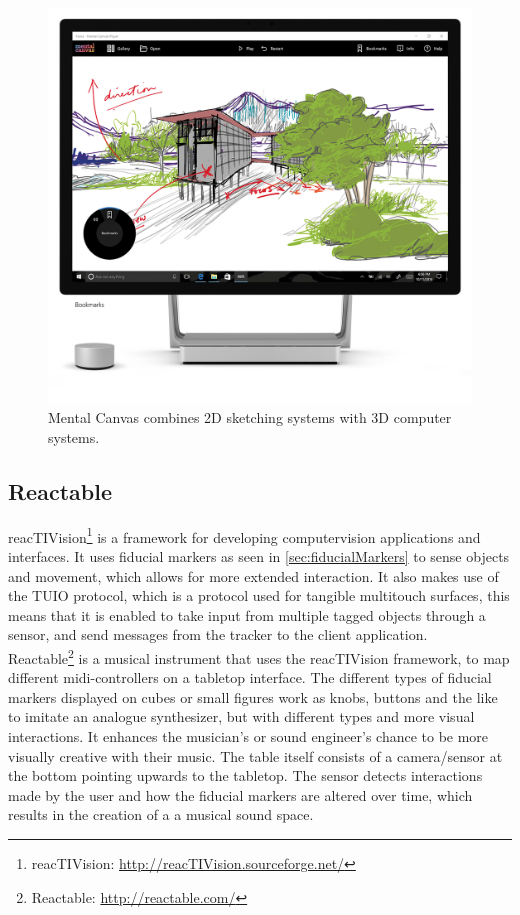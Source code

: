 \begin{figure}[H]
	\centering
	\includegraphics[width=0.5\linewidth]{figure/Analysis/mentalCanvas.png}
	\caption{Mental Canvas combines 2D sketching systems with 3D computer systems.}
	\label{fig:mentalCanvas}
\end{figure}

\subsection{Reactable}
reacTIVision\footnote{reacTIVision: \url{http://reacTIVision.sourceforge.net/}} is a framework for developing computervision applications and interfaces. It uses fiducial markers as seen in  \autoref{sec:fiducialMarkers} to sense objects and movement, which allows for more extended interaction. It also makes use of the TUIO protocol, which is a protocol used for tangible multitouch surfaces, this means that it is enabled to take input from multiple tagged objects through a sensor, and send messages from the tracker to the client application. \\

Reactable\footnote{Reactable: \url{http://reactable.com/}} is a musical instrument that uses the reacTIVision framework, to map different midi-controllers on a tabletop interface. The different types of fiducial markers displayed on cubes or small figures work as knobs, buttons and the like to imitate an analogue synthesizer, but with different types and more visual interactions. It enhances the musician's or sound engineer's chance to be more visually creative with their music. The table itself consists of a camera/sensor at the bottom pointing upwards to the tabletop. The sensor detects interactions made by the user and how the fiducial markers are altered over time, which results in the creation of a a musical sound space.

